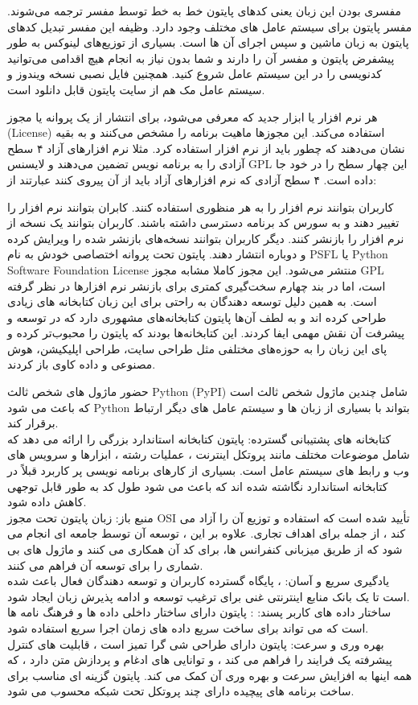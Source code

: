 مفسری بودن این زبان یعنی کدهای پایتون خط به خط توسط مفسر ترجمه می‌شوند. مفسر پایتون برای سیستم عامل های مختلف وجود دارد. وظیفه این مفسر تبدیل کدهای پایتون به زبان ماشین و سپس اجرای آن ها است. بسیاری از توزیع‌های لینوکس به طور پیشفرض پایتون و مفسر آن را دارند و شما بدون نیاز به انجام هیچ اقدامی می‌توانید کدنویسی را در این سیستم عامل شروع کنید. همچنین فایل نصبی نسخه ویندوز و سیستم عامل مک‌ هم از سایت پایتون قابل دانلود است.

هر نرم افزار یا ابزار جدید که معرفی می‌شود، برای انتشار از یک پروانه یا مجوز (License) استفاده می‌کند. این مجوزها ماهیت برنامه را مشخص می‌کنند و به بقیه نشان می‌دهند که چطور باید از نرم افزار استفاده کرد. مثلا نرم افزارهای آزاد ۴ سطح آزادی را به برنامه نویس تضمین می‌دهند و لایسنس GPL این چهار سطح را در خود جا داده است. ۴ سطح آزادی که نرم افزارهای آزاد باید از آن پیروی کنند عبارتند از:

کاربران بتوانند نرم افزار را به هر منظوری استفاده کنند.
کابران بتوانند نرم افزار را تغییر دهند و به سورس کد برنامه دسترسی داشته باشند.
کاربران بتوانند یک نسخه از نرم افزار را بازنشر کنند.
دیگر کاربران بتوانند نسخه‌های بازنشر شده را ویرایش کرده و دوباره انتشار دهند.
پایتون تحت پروانه اختصاصی خودش به نام PSFL یا Python Software Foundation License منتشر می‌شود. این مجوز کاملا مشابه مجوز GPL است، اما در بند چهارم سخت‌گیری کمتری برای بازنشر نرم افزارها در نظر گرفته است. به همین دلیل توسعه دهندگان به راحتی برای این زبان کتابخانه های زیادی طراحی کرده اند و به لطف آن‌ها پایتون کتابخانه‌های مشهوری دارد که در توسعه و پیشرفت آن نقش مهمی ایفا کردند. این کتابخانه‌ها بودند که پایتون را محبوب‌تر کرده و پای این زبان را به حوزه‌های مختلفی مثل طراحی سایت، طراحی اپلیکیشن، هوش مصنوعی و داده کاوی باز کردند.


حضور ماژول های شخص ثالث
Python (PyPI) شامل چندین ماژول شخص ثالث است که باعث می شود Python بتواند با بسیاری از زبان ها و سیستم عامل های دیگر ارتباط برقرار کند.\\
کتابخانه های پشتیبانی گسترده:
پایتون کتابخانه استاندارد بزرگی را ارائه می دهد که شامل موضوعات مختلف مانند پروتکل اینترنت ، عملیات رشته ، ابزارها و سرویس های وب و رابط های سیستم عامل است. بسیاری از کارهای برنامه نویسی پر کاربرد قبلاً در کتابخانه استاندارد نگاشته شده اند که باعث می شود طول کد به طور قابل توجهی کاهش داده شود.\\
منبع باز:
زبان پایتون تحت مجوز OSI تأیید شده است که استفاده و توزیع آن را آزاد می کند ، از جمله برای اهداف تجاری. علاوه بر این ، توسعه آن توسط جامعه ای انجام می شود که از طریق میزبانی کنفرانس ها، برای کد آن همکاری می کنند و ماژول های بی شماری را برای توسعه آن فراهم می کنند.\\
یادگیری سریع و آسان:
، پایگاه گسترده کاربران و توسعه دهندگان فعال باعث شده است تا یک بانک منابع اینترنتی غنی برای ترغیب توسعه و ادامه پذیرش زبان ایجاد شود.\\
ساختار داده های کاربر پسند: :
پایتون دارای ساختار داخلی داده ها و فرهنگ نامه ها است که می تواند برای ساخت سریع داده های زمان اجرا سریع استفاده شود.\\
بهره وری و سرعت:
پایتون دارای طراحی شی گرا تمیز است ، قابلیت های کنترل پیشرفته یک فرایند را فراهم می کند ، و توانایی های ادغام و پردازش متن دارد ، که همه اینها به افزایش سرعت و بهره وری آن کمک می کند. پایتون گزینه ای مناسب برای ساخت برنامه های پیچیده دارای چند پروتکل تحت شبکه محسوب می شود.

